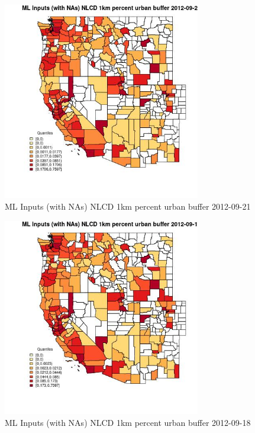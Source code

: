 \begin{figure} 
\centering  
\includegraphics[width=0.77\textwidth]{Code_Outputs/Report_ML_input_PM25_Step4_part_e_de_duplicated_aves_compiled_2019-05-14wNAs_CountyNLCD_1km_percent_urban_bufferMean2012-09-21_2012-09-21.jpg} 
\caption{\label{fig:Report_ML_input_PM25_Step4_part_e_de_duplicated_aves_compiled_2019-05-14wNAsCountyNLCD_1km_percent_urban_bufferMean2012-09-21_2012-09-21}ML Inputs (with NAs) NLCD 1km percent urban buffer 2012-09-21} 
\end{figure} 
 

\begin{figure} 
\centering  
\includegraphics[width=0.77\textwidth]{Code_Outputs/Report_ML_input_PM25_Step4_part_e_de_duplicated_aves_compiled_2019-05-14wNAs_CountyNLCD_1km_percent_urban_bufferMean2012-09-18_2012-09-18.jpg} 
\caption{\label{fig:Report_ML_input_PM25_Step4_part_e_de_duplicated_aves_compiled_2019-05-14wNAsCountyNLCD_1km_percent_urban_bufferMean2012-09-18_2012-09-18}ML Inputs (with NAs) NLCD 1km percent urban buffer 2012-09-18} 
\end{figure} 
 

